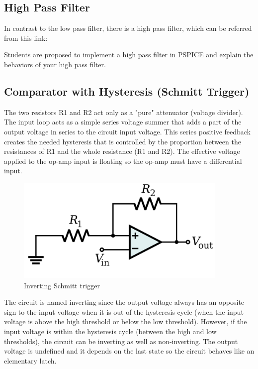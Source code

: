 \subsection{High Pass Filter}
In contrast to the low pass filter, there is a high pass filter, which can be referred from this link:
\begin{center}
\end{center}

Students are proposed to implement a high pass filter in PSPICE and explain the behaviors of your high pass filter.

\subsection{Comparator with Hysteresis (Schmitt Trigger)}
The two resistors R1 and R2 act only as a "pure" attenuator (voltage divider). The input loop acts as a simple series voltage summer that adds a part of the output voltage in series to the circuit input voltage. This series positive feedback creates the needed hysteresis that is controlled by the proportion between the resistances of R1 and the whole resistance (R1 and R2). The effective voltage applied to the op-amp input is floating so the op-amp must have a differential input.\\

\begin{figure}[!htp]
    \centering
    \includegraphics[width = 4in]{source/picture/bai_5/sTrigger.png}
    \caption{Inverting Schmitt trigger}
    \label{lab05_low_filter5}
\end{figure}


The circuit is named inverting since the output voltage always has an opposite sign to the input voltage when it is out of the hysteresis cycle (when the input voltage is above the high threshold or below the low threshold). However, if the input voltage is within the hysteresis cycle (between the high and low thresholds), the circuit can be inverting as well as non-inverting. The output voltage is undefined and it depends on the last state so the circuit behaves like an elementary latch.\\

